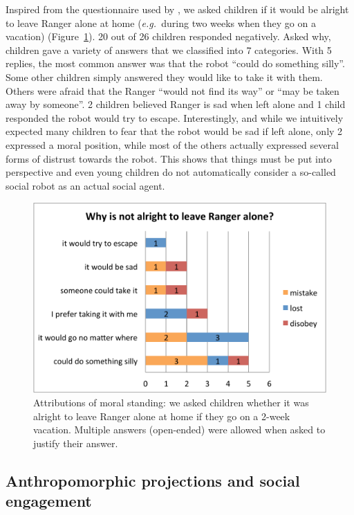 \documentclass{sig-alternate}
\newcommand{\eg}{{\textit{e.g.~}}}
\begin{document}
Inspired from the questionnaire used by \cite{kahn_jr._robotic_2006}, we asked
children if it would be alright to leave Ranger alone at home (\eg during two
weeks when they go on a vacation) (Figure~\ref{fig:domino-leave-alone}). 
20 out of 26 children responded negatively. Asked why, children gave a
variety of answers that we classified into 7 categories. With 5 replies, the
most common answer was that the robot ``could do something silly''. Some other
children simply answered they would like to take it with them. Others were
afraid that the Ranger ``would not find its way'' or ``may be taken away by
someone''. 2 children believed Ranger is sad when left alone and 1 child
responded the robot would try to escape. Interestingly, and while we intuitively
expected many children to fear that the robot would be sad if left alone, only 2
expressed a moral position, while most of the others actually expressed several
forms of distrust towards the robot. This shows that things must
be put into perspective and even young children do not automatically consider a
so-called social robot as an actual social agent.

\begin{figure}[!h]
    \centering 
    \includegraphics[width=1.0\linewidth]{domino-leave-why.pdf}
    \caption{\small Attributions of moral
        standing: we asked children whether it was alright to leave Ranger
        alone at home if they go on a 2-week vacation. Multiple answers
        (open-ended) were allowed when asked to justify their answer.}

    \label{fig:domino-leave-alone} 
\end{figure}

\subsection{Anthropomorphic projections and social engagement}
\end{document}
